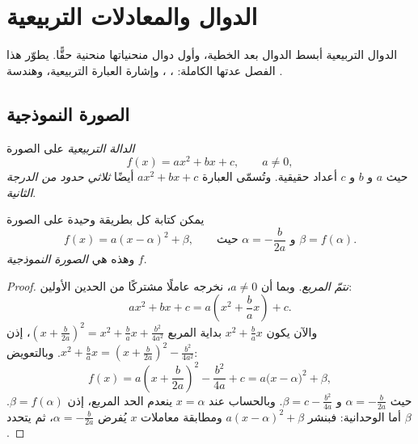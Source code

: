 \chapter{الدوال والمعادلات التربيعية}\label{ch:g11:quad}

الدوال التربيعية أبسط الدوال بعد الخطية، وأول
دوال منحنياتها منحنية حقًّا. يطوّر هذا الفصل
عدتها الكاملة: ، ، وإشارة
العبارة التربيعية، وهندسة .

\section{الصورة النموذجية}

\begin{definition}\label{def:g11:quad:quadratic}
\emph{الدالة التربيعية}  على
الصورة
\[
f(x) = ax^2 + bx + c, \qquad a \neq 0,
\]
حيث $a$ و $b$ و $c$ أعداد حقيقية. وتُسمّى العبارة $ax^2 + bx + c$
أيضًا \emph{ثلاثي حدود من الدرجة الثانية}.
\end{definition}

\begin{theorem}\label{thm:g11:quad:canonical}
يمكن كتابة كل  بطريقة وحيدة على الصورة
\[
f(x) = a(x - \alpha)^2 + \beta,
\qquad\text{حيث } \alpha = -\frac{b}{2a} \text{ و } \beta = f(\alpha).
\]
وهذه هي \emph{الصورة النموذجية}  $f$.
\end{theorem}

\begin{proof}
\emph{نتمّ المربع}. وبما أن $a \neq 0$، نخرجه عاملًا مشتركًا من الحدين
الأولين:
\[
ax^2 + bx + c = a\left(x^2 + \frac{b}{a}x\right) + c .
\]
والآن يكون $x^2 + \frac{b}{a}x$ بداية المربع
$\left(x + \frac{b}{2a}\right)^2 = x^2 + \frac ba x + \frac{b^2}{4a^2}$،
إذن $x^2 + \frac{b}{a}x = \left(x + \frac{b}{2a}\right)^2 -
\frac{b^2}{4a^2}$. وبالتعويض:
\[
f(x) = a\left(x + \frac{b}{2a}\right)^2 - \frac{b^2}{4a} + c
= a\bigl(x - \alpha\bigr)^2 + \beta,
\]
حيث $\alpha = -\frac{b}{2a}$ و $\beta = c - \frac{b^2}{4a}$. وبالحساب
عند $x = \alpha$ ينعدم الحد المربع، إذن $\beta = f(\alpha)$. أما الوحدانية:
فبنشر $a(x-\alpha)^2 + \beta$ ومطابقة معاملات $x$
يُفرض $\alpha = -\frac{b}{2a}$، ثم يتحدد $\beta$.
\end{proof}

